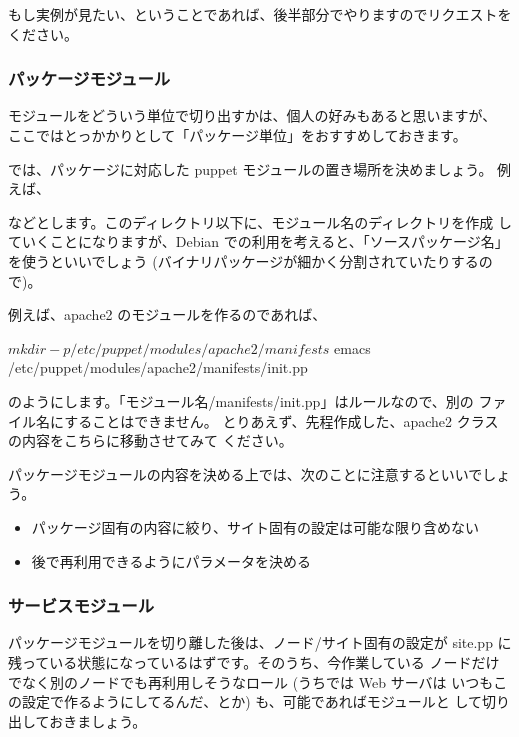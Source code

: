 \documentclass[mingoth,a4paper]{jsarticle}
\begin{document}
もし実例が見たい、ということであれば、後半部分でやりますのでリクエストを
ください。

\subsubsection{パッケージモジュール}

モジュールをどういう単位で切り出すかは、個人の好みもあると思いますが、
ここではとっかかりとして「パッケージ単位」をおすすめしておきます。

では、パッケージに対応した puppet モジュールの置き場所を決めましょう。
例えば、


などとします。このディレクトリ以下に、モジュール名のディレクトリを作成
していくことになりますが、Debian での利用を考えると、「ソースパッケージ名」
を使うといいでしょう (バイナリパッケージが細かく分割されていたりするので)。

例えば、apache2 のモジュールを作るのであれば、

\begin{commandline}
$ mkdir -p /etc/puppet/modules/apache2/manifests
$ emacs /etc/puppet/modules/apache2/manifests/init.pp
\end{commandline}

のようにします。「モジュール名/manifests/init.pp」はルールなので、別の
ファイル名にすることはできません。
とりあえず、先程作成した、apache2 クラスの内容をこちらに移動させてみて
ください。

パッケージモジュールの内容を決める上では、次のことに注意するといいでしょう。
\begin{itemize}
\item
  パッケージ固有の内容に絞り、サイト固有の設定は可能な限り含めない
\item
  後で再利用できるようにパラメータを決める
\end{itemize}

\subsubsection{サービスモジュール}

パッケージモジュールを切り離した後は、ノード/サイト固有の設定が
site.pp に残っている状態になっているはずです。そのうち、今作業している
ノードだけでなく別のノードでも再利用しそうなロール (うちでは Web サーバは
いつもこの設定で作るようにしてるんだ、とか) も、可能であればモジュールと
して切り出しておきましょう。
\end{document}
